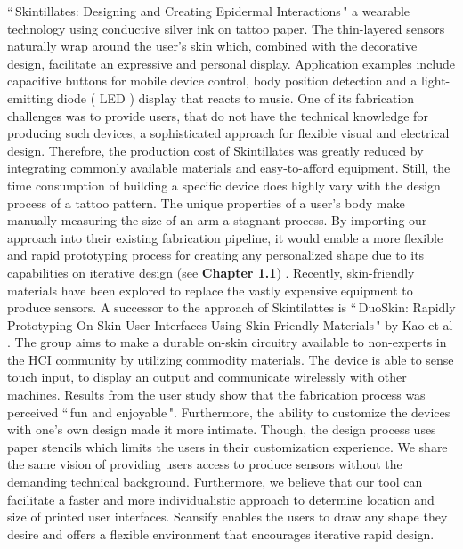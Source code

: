 ``\,Skintillates: Designing and Creating Epidermal Interactions\," a wearable technology using conductive silver ink on tattoo paper. The thin-layered sensors naturally wrap around the user's skin which, combined with the decorative design, facilitate an expressive and personal display. Application examples include capacitive buttons for mobile device control, body position detection and a light-emitting diode ( LED ) display that reacts to music. One of its fabrication challenges was to provide users, that do not have the technical knowledge for producing such devices, a sophisticated approach for flexible visual and electrical design. Therefore, the production cost of Skintillates was greatly reduced by integrating commonly available materials and easy-to-afford equipment. Still, the time consumption of building a specific device does highly vary with the design process of a tattoo pattern. The unique properties of a user's body make manually measuring the size of an arm a stagnant process. By importing our approach into their existing fabrication pipeline, it would enable a more flexible and rapid prototyping process for creating any personalized shape due to its capabilities on iterative design (see \textbf{\hyperref[item:functionality]{Chapter 1.1}})
. 
\newpara 
Recently, skin-friendly materials have been explored to replace the vastly expensive equipment to produce sensors. A successor to the approach of Skintilattes is ``\,DuoSkin: Rapidly Prototyping On-Skin User Interfaces Using Skin-Friendly Materials\," by Kao et al \cite{Kao:2016:DRP:2971763.2971777}. The group aims to make a durable on-skin circuitry available to non-experts in the HCI community by utilizing commodity materials. The device is able to sense touch input, to display an output and communicate wirelessly with other machines. Results from the user study show that the fabrication process was perceived ``\,fun and enjoyable\,". Furthermore, the ability to customize the devices with one's own design made it more intimate. Though, the design process uses paper stencils which limits the users in their customization experience. We share the same vision of providing users access to produce sensors without the demanding technical background. Furthermore, we believe that our tool can facilitate a faster and more individualistic approach to determine location and size of printed user interfaces. Scansify enables the users to draw any shape they desire and offers a flexible environment that encourages iterative rapid design.

